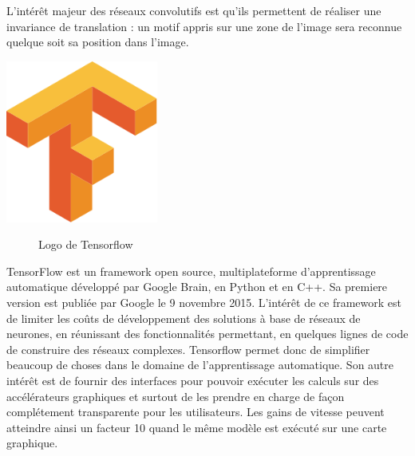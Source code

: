 L'intérêt majeur des réseaux convolutifs est qu'ils permettent de réaliser une invariance
de translation : un motif appris sur une zone de l'image sera reconnue
quelque soit sa position dans l'image.

\hypertarget{Tensorflow}{%
\label{Tensorflow}}

\begin{center}
\label{fig:Tensorflow_logo}
\centering
\includegraphics[width=5cm]{./images/Tensorflow_logo.png}
\begin{figure}[h!]
\caption{Logo de Tensorflow}
\end{figure}
\end{center}


TensorFlow est un framework open source,
multiplateforme d'apprentissage automatique développé par Google Brain,
en Python et en C++.
Sa premiere version est publiée par Google le 9 novembre 2015.
L'intérêt de ce framework est de limiter les coûts de développement des solutions à base
de réseaux de neurones, en réunissant des fonctionnalités permettant,
en quelques lignes de code de construire des réseaux complexes.
Tensorflow permet donc de simplifier beaucoup de choses dans
le domaine de l'apprentissage automatique.
Son autre intérêt est de fournir des interfaces pour pouvoir exécuter les calculs sur
des accélérateurs graphiques et surtout de les prendre en charge
de façon complétement transparente pour les utilisateurs.
Les gains de vitesse peuvent atteindre ainsi un facteur 10 quand le même modèle est exécuté
sur une carte graphique.

\hypertarget{plan}{%
\label{Présentation du plan du rapport}}
